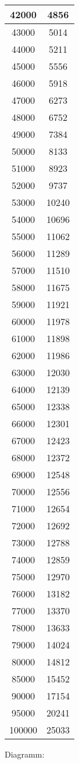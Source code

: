 \documentclass[ngerman,a4paper]{report}
\begin{document}
\begin{tabular}{|c|c|}
\hline
42000 & 4856\\
\hline
43000 & 5014\\
\hline
44000 & 5211\\
\hline
45000 & 5556\\
\hline
46000 & 5918\\
\hline
47000 & 6273\\
\hline
48000 & 6752\\
\hline
49000 & 7384\\
\hline
50000 & 8133\\
\hline
51000 & 8923\\
\hline
52000 & 9737\\
\hline
53000 & 10240\\
\hline
54000 & 10696\\
\hline
55000 & 11062\\
\hline
56000 & 11289\\
\hline
57000 & 11510\\
\hline
58000 & 11675\\
\hline
59000 & 11921\\
\hline
60000 & 11978\\
\hline
61000 & 11898\\
\hline
62000 & 11986\\
\hline
63000 & 12030\\
\hline
64000 & 12139\\
\hline
65000 & 12338\\
\hline
66000 & 12301\\
\hline
67000 & 12423\\
\hline
68000 & 12372\\
\hline
69000 & 12548\\
\hline
70000 & 12556\\
\hline
71000 & 12654\\
\hline
72000 & 12692\\
\hline
73000 & 12788\\
\hline
74000 & 12859\\
\hline
75000 & 12970\\
\hline
76000 & 13182\\
\hline
77000 & 13370\\
\hline
78000 & 13633\\
\hline
79000 & 14024\\
\hline
80000 & 14812\\
\hline
85000 & 15452\\
\hline
90000 & 17154\\
\hline
95000 & 20241\\
\hline
100000 & 25033\\
\hline
\end{tabular}

Diagramm:
\end{document}
